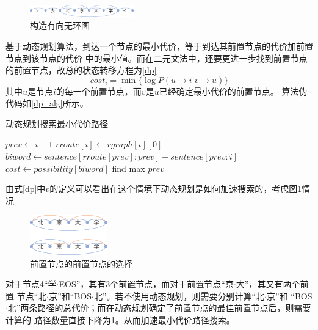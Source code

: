 \begin{figure}[H]
  \centering
  \includegraphics[width=0.4\textwidth]{figures/figure_07.png}
  \caption{构造有向无环图}
\end{figure}

基于动态规划算法，到达一个节点的最小代价，等于到达其前置节点的代价加前置节点到该节点的代价
中的最小值。而在二元文法中，还要更进一步找到前置节点的前置节点，故总的状态转移方程为\ref{dp}
\begin{equation}
  cost_i = \min \{ \log P\left(u \rightarrow i | v \rightarrow u \right) \}
  \label{dp}
\end{equation}
其中$u$是节点$i$的每一个前置节点，而$v$是$u$已经确定最小代价的前置节点。
算法伪代码如\ref{dp_alg}所示。

\begin{algorithm}
  \caption{动态规划搜索最小代价路径}
  \begin{algorithmic}
    \STATE $prev \gets i-1$
    \STATE $rroute[i] \gets rgraph[i][0]$
    \ELSE
    \STATE $biword \gets sentence[rroute[prev]:prev]-sentence[prev:i]$
    \STATE $cost \gets possibility[biword]$
    \ENDFOR
    \STATE find max $prev$
    \ENDIF
    \ENDFOR
  \end{algorithmic}
  \label{dp_alg}
\end{algorithm}

由式\ref{dp}中$v$的定义可以看出在这个情境下动态规划是如何加速搜索的，考虑图\ref{p6}情况

\begin{figure}[H]
  \centering
  \includegraphics[width=0.3\textwidth]{figures/figure_08.png}
  \caption{前置节点的前置节点的选择}
  \label{p6}
\end{figure}

对于节点4“学$\cdot$EOS”，其有3个前置节点，而对于前置节点“京$\cdot$大”，其又有两个前置
节点“北$\cdot$京”和“BOS$\cdot$北”。若不使用动态规划，则需要分别计算“北$\cdot$京”和
“BOS$\cdot$北”两条路径的总代价；而在动态规划确定了前置节点的最佳前置节点后，则需要计算的
路径数量直接下降为1。从而加速最小代价路径搜索。

